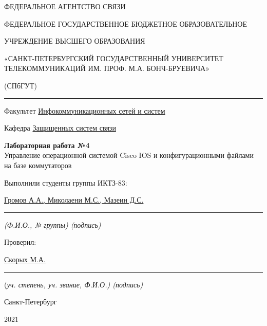 \documentclass[a4paper,14pt]{extarticle}
\begin{document}
    \begin{center}
        \thispagestyle{empty}
        \begin{singlespace}
        ФЕДЕРАЛЬНОЕ АГЕНТСТВО СВЯЗИ

        ФЕДЕРАЛЬНОЕ ГОСУДАРСТВЕННОЕ БЮДЖЕТНОЕ ОБРАЗОВАТЕЛЬНОЕ

        УЧРЕЖДЕНИЕ ВЫСШЕГО ОБРАЗОВАНИЯ

        «САНКТ-ПЕТЕРБУРГСКИЙ ГОСУДАРСТВЕННЫЙ УНИВЕРСИТЕТ ТЕЛЕКОММУНИКАЦИЙ ИМ. ПРОФ. М.А. БОНЧ-БРУЕВИЧА»

        (СПбГУТ)
        \end{singlespace}
        \vspace{-1ex}
        \rule{\textwidth}{0.4pt}
        \vspace{-5ex}

        Факультет \underline{Инфокоммуникационных сетей и систем}

        Кафедра \underline{Защищенных систем связи}
        \vspace{10ex}

        \textbf{Лабораторная работа №4}\\
    Управление операционной системой Cisco IOS и конфигурационными файлами на базе коммутаторов
        


    \end{center}
    \vspace{4ex}
    \begin{flushright}
    \parbox{10 cm}{
    \begin{flushleft}
        Выполнили студенты группы ИКТЗ-83:

        \underline{Громов А.А., Миколаени М.С., Мазеин Д.С.} \hfill \rule[-0.85ex]{0.1\textwidth}{0.6pt}

        \footnotesize \textit{ (Ф.И.О., № группы) \hfill (подпись)} \normalsize

        Проверил:

        \underline{Скорых М.А.} \hfill \rule[-0.85ex]{0.1\textwidth}{0.6pt}

        (\footnotesize \textit{уч. степень, уч. звание, Ф.И.О.) \hfill (подпись)} \normalsize

    \end{flushleft}
    }
    \end{flushright}
    \begin{center}
        \vfill
        Санкт-Петербург

        2021

    \end{center}
    \newpage
\end{document}
